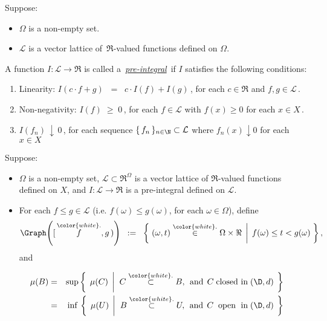 \begin{definition}
\mbox{}\vskip 0.1cm
\noindent
Suppose:
\begin{itemize}
\item
	$\Omega$ is a non-empty set.
\item
	$\mathcal{L}$ is a vector lattice of \,$\Re$-valued functions defined on $\Omega$.
\end{itemize}
A function $I : \mathcal{L} \longrightarrow \Re$ is called a \,\underline{\textit{pre-integral}}\,
if $I$ satisfies the following conditions:
\begin{enumerate}
\item
	Linearity:\;\;
	$I(c \cdot f + g) \;\; = \;\; c \cdot I(f) + I(g)$\,,
	for each $c \in \Re$ and $f, g \in \mathcal{L}$\,.
\item
	Non-negativity:\;\; $I(f) \; \geq \; 0$\,,\;\;
	for each $f \in \mathcal{L}$ with $f(x) \geq 0$ for each $x \in X$\,.
\item
	$I(f_{n}) \, \downarrow \, 0$\,,
	for each sequence $\{\,f_{n}\,\}_{n\in\N} \subset \mathcal{L}$ where $f_{n}(x) \downarrow 0$ for each $x \in X$
\end{enumerate}
\end{definition}


\begin{theorem}
\mbox{}\vskip 0.1cm
\noindent
Suppose:
\begin{itemize}
\item
	$\Omega$ is a non-empty set,
	$\mathcal{L} \subset \Re^{\Omega}$ is a vector lattice of $\Re$-valued functions defined on $X$, and
	$I : \mathcal{L} \longrightarrow \Re$ is a pre-integral defined on $\mathcal{L}$.
\item
	For each $f \leq g \in \mathcal{L}$ (i.e. $f(\omega) \leq g(\omega)$, for each $\omega \in \Omega$), define
	\begin{equation*}
	\Graph\!\left([\,\overset{{\color{white}.}}{f},g\,)\right)
	\;\; := \;\;
		\left\{\,
		\left.
		(\omega,t) \overset{{\color{white}.}}{\in} \Omega \times \Re
		\,\;\right\vert\;
		f(\omega) \leq t < g(\omega)
		\;\right\},
	\end{equation*}
	and
\end{itemize}
\begin{eqnarray*}
\mu(B)
& = &
	\sup\left\{\;\,\mu(C)\;\left\vert\;\;
		C \overset{{\color{white}.}}{\subset} B,
		\;\,\textnormal{and}\;\,
		C \;\textnormal{closed in}\; (\D,d)
	\right.\;\right\}
\\
& = &
	\,\inf\,\left\{\;\,\mu(U)\;\left\vert\;\;
		B \overset{{\color{white}.}}{\subset} U,
		\;\,\textnormal{and}\;\,
		C \;\textnormal{\;open\; in}\; (\D,d)
	\right.\;\right\}
\end{eqnarray*} 
\end{theorem}

